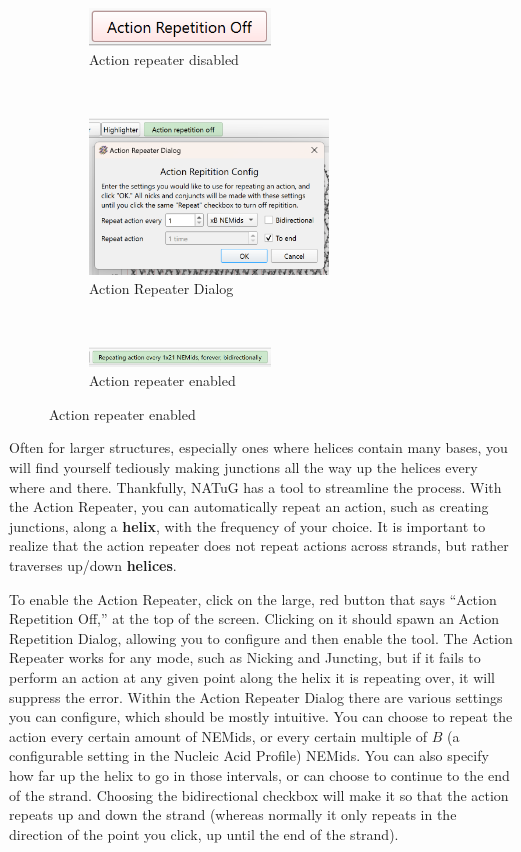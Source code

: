\documentclass[titlepage]{article}
\begin{document}
\begin{figure}
	\centering
	\caption{Enabling the Action Repeater}
	\begin{subfigure}{.3\linewidth}
		\centering
		\includegraphics[width=1.9in]{action-repeater-disabled.png}
		\caption{Action repeater disabled}
	\end{subfigure}%
	~
	\begin{subfigure}{.4\linewidth}
		\centering
		\includegraphics[width=2.5in]{action-repeater-enablement.png}
		\caption{Action Repeater Dialog}
	\end{subfigure}%
	~
	\begin{subfigure}{.3\linewidth}
		\centering
		\includegraphics[width=1.9in]{action-repeater-enabled.png}
		\caption{Action repeater enabled}
	\end{subfigure}
\end{figure}

Often for larger structures, especially ones where helices contain many bases, you will find yourself tediously making junctions all the way up the helices every where and there. Thankfully, NATuG has a tool to streamline the process. With the Action Repeater, you can automatically repeat an action, such as creating junctions, along a \textbf{helix}, with the frequency of your choice. It is important to realize that the action repeater does not repeat actions across strands, but rather traverses up/down \textbf{helices}.

To enable the Action Repeater, click on the large, red button that says ``Action Repetition Off,'' at the top of the screen. Clicking on it should spawn an Action Repetition Dialog, allowing you to configure and then enable the tool. The Action Repeater works for any mode, such as Nicking and Juncting, but if it fails to perform an action at any given point along the helix it is repeating over, it will suppress the error. Within the Action Repeater Dialog there are various settings you can configure, which should be mostly intuitive. You can choose to repeat the action every certain amount of NEMids, or every certain multiple of $B$ (a configurable setting in the Nucleic Acid Profile) NEMids. You can also specify how far up the helix to go in those intervals, or can choose to continue to the end of the strand. Choosing the bidirectional checkbox will make it so that the action repeats up and down the strand (whereas normally it only repeats in the direction of the point you click, up until the end of the strand).
\end{document}
